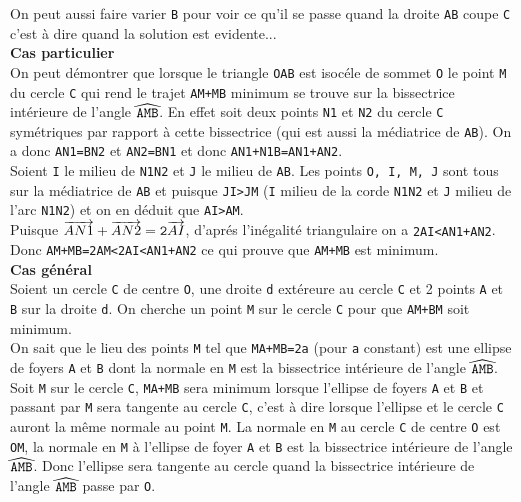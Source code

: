 \documentclass[a4paper,11pt]{book}
\begin{document}
On peut aussi faire varier {\tt B} pour voir ce qu'il se passe quand la droite 
{\tt AB} coupe {\tt C} c'est \`a dire quand la solution est evidente...\\
{\bf Cas particulier}\\
On peut d\'emontrer que lorsque le triangle {\tt OAB} est isoc\'ele de sommet 
{\tt O} le point {\tt M} du cercle {\tt C} qui rend le trajet {\tt AM+MB} 
minimum se trouve sur la bissectrice int\'erieure de l'angle 
${\tt \widehat{AMB}}$. En effet soit deux points {\tt N1} et {\tt N2}
du cercle {\tt C} sym\'etriques par rapport \`a cette bissectrice (qui est 
aussi la m\'ediatrice de {\tt AB}). On a donc {\tt AN1=BN2} et {\tt AN2=BN1} 
et donc {\tt AN1+N1B=AN1+AN2}.\\
Soient {\tt I} le milieu de {\tt N1N2} et {\tt J} le milieu de {\tt AB}.
Les points  {\tt O, I, M, J} sont tous sur la m\'ediatrice de {\tt AB} et 
puisque  {\tt JI>JM} ({\tt I} milieu de la corde {\tt N1N2} et 
 {\tt J} milieu de l'arc {\tt N1N2}) et on en d\'eduit que {\tt AI>AM}.\\
Puisque ${\tt \overrightarrow{AN1} +\overrightarrow{AN2}=2\overrightarrow{AI}}$,
 d'apr\'es l'in\'egalit\'e triangulaire on a {\tt 2AI<AN1+AN2}. Donc
{\tt AM+MB=2AM<2AI<AN1+AN2} ce qui prouve que {\tt AM+MB} est minimum.\\
{\bf Cas g\'en\'eral}\\
Soient un cercle {\tt C} de centre {\tt O}, une droite {\tt d} ext\'ereure au 
cercle {\tt C} et 2 points  {\tt A} et {\tt B} sur la droite {\tt d}.
On cherche un point {\tt M} sur le cercle {\tt C} pour que {\tt AM+BM} soit 
minimum.\\
On sait que le lieu des points {\tt M} tel que  {\tt MA+MB=2a} (pour {\tt a} 
constant) est une ellipse de foyers {\tt A} et {\tt B} dont la normale en 
{\tt M} est la bissectrice int\'erieure de l'angle ${\tt \widehat{AMB}}$.\\
Soit {\tt M} sur le cercle {\tt C}, {\tt MA+MB} sera minimum lorsque l'ellipse 
de foyers {\tt A} et {\tt B} et passant par {\tt M} sera tangente au cercle 
{\tt C}, c'est \`a dire lorsque l'ellipse et le cercle {\tt C} auront la
m\^eme normale au point {\tt M}. La normale en {\tt M} au cercle {\tt C} de 
centre {\tt O} est {\tt OM}, la normale en {\tt M} \`a l'ellipse de foyer 
{\tt A} et {\tt B} est la bissectrice int\'erieure de l'angle 
${\tt \widehat{AMB}}$.
Donc l'ellipse sera tangente au cercle quand la bissectrice int\'erieure de 
l'angle ${\tt \widehat{AMB}}$ passe par {\tt O}.\\
\end{document}
